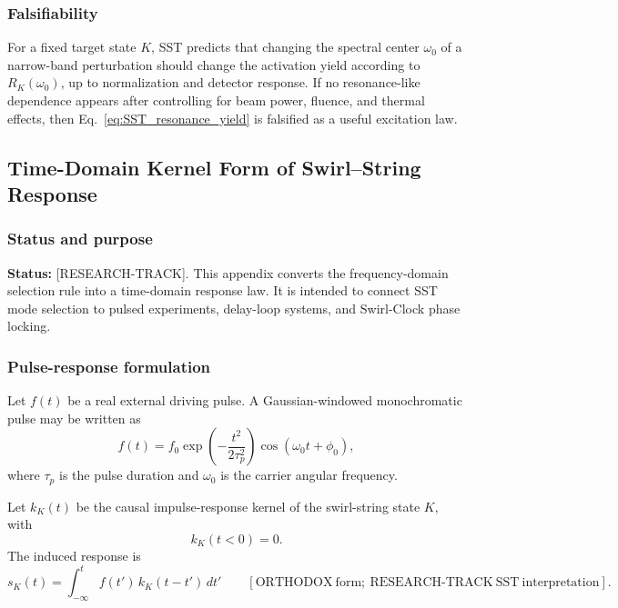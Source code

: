     \subsubsection*{Falsifiability}
        
        For a fixed target state \(K\), SST predicts that changing the spectral center \(\omega_0\) of a narrow-band perturbation should change the activation yield according to \(R_K(\omega_0)\), up to normalization and detector response. If no resonance-like dependence appears after controlling for beam power, fluence, and thermal effects, then Eq.~\eqref{eq:SST_resonance_yield} is falsified as a useful excitation law.

\subsection{Time-Domain Kernel Form of Swirl--String Response}
    \label{app:time-domain-kernel-response}
    
    \subsubsection*{Status and purpose}
        
        \noindent
        \textbf{Status:} [RESEARCH-TRACK].
        This appendix converts the frequency-domain selection rule into a time-domain response law. It is intended to connect SST mode selection to pulsed experiments, delay-loop systems, and Swirl-Clock phase locking.
    
    \subsubsection*{Pulse-response formulation}
        
        Let \(f(t)\) be a real external driving pulse. A Gaussian-windowed monochromatic pulse may be written as
        \begin{equation}
            f(t)
            =
            f_0
            \exp\!\left(-\frac{t^2}{2\tau_p^2}\right)
            \cos(\omega_0 t+\phi_0),
            \label{eq:gaussian_drive_pulse}
        \end{equation}
        where \(\tau_p\) is the pulse duration and \(\omega_0\) is the carrier angular frequency.
        
        Let \(k_K(t)\) be the causal impulse-response kernel of the swirl-string state \(K\), with
        \begin{equation}
            k_K(t<0)=0.
        \end{equation}
        The induced response is
        \begin{equation}
            \boxed{
                s_K(t)
                =
                \int_{-\infty}^{t}
                f(t')\,k_K(t-t')\,dt'
            }
            \qquad
            [\mathrm{ORTHODOX\ form;\ RESEARCH\text{-}TRACK\ SST\ interpretation}].
            \label{eq:SST_convolution_response}
        \end{equation}
    
